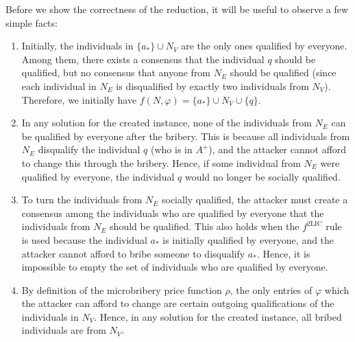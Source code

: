 \documentclass[
    12pt,               %
    a4paper,            %
    bibtotoc,           %
    pointlessnumbers,   %
    ngerman,            %
    titlepage,          %
    leqno,              %
    ]{scrarticle}       %
\begin{document}
\begin{Proof}
Before we show the correctness of the reduction, it will be useful to observe a few simple facts:

\begin{enumerate}[
    topsep=-4pt,
    leftmargin=*,
    itemindent=4.96em,
    label={\textit{Fact \ref*{thm:2ic_cgmb_npc}.\arabic*}:},
    ref={\ref*{thm:2ic_cgmb_npc}.\arabic*}
]
\item \label{fact:2ic_cgmb_initial_situation}
Initially, the individuals in $\{a_\ast\} \cup N_V$ are the only ones qualified by everyone. Among them, there exists a consensus that the individual $q$ should be qualified, but no consensus that anyone from $N_E$ should be qualified (since each individual in $N_E$ is disqualified by exactly two individuals from $N_V$). Therefore, we initially have $f(N, \varphi) = \{a_\ast\} \cup N_V \cup \{q\}$.

\item \label{fact:2ic_cgmb_n_e_not_qualified_by_everyone}
In any solution for the created instance, none of the individuals from $N_E$ can be qualified by everyone after the bribery. This is because all individuals from $N_E$ disqualify the individual $q$ (who is in $A^+$), and the attacker cannot afford to change this through the bribery. Hence, if some individual from $N_E$ were qualified by everyone, the individual $q$ would no longer be socially qualified.

\item \label{fact:2ic_cgmb_make_n_e_socially_qualified}
To turn the individuals from $N_E$ socially qualified, the attacker must create a consensus among the individuals who are qualified by everyone that the individuals from $N_E$ should be qualified. This also holds when the $f^{\text{2LIC}}$ rule is used because the individual $a_\ast$ is initially qualified by everyone, and the attacker cannot afford to bribe someone to disqualify $a_\ast$. Hence, it is impossible to empty the set of individuals who are qualified by everyone.

\item \label{fact:2ic_cgmb_all_bribed_are_from_n_v}
By definition of the microbribery price function $\rho$, the only entries of $\varphi$ which the attacker can afford to change are certain outgoing qualifications of the individuals in $N_V$. Hence, in any solution for the created instance, all bribed individuals are from $N_V$.


\end{enumerate}
\end{Proof}
\end{document}
